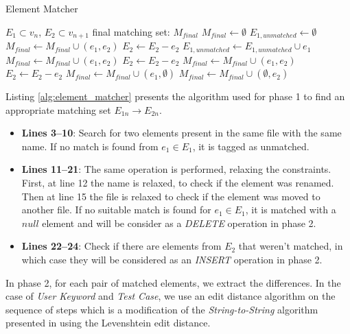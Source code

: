 \begin{algorithm}[!t]
\caption{Element Matcher}
\label{alg:element_matcher}
\begin{algorithmic}[1] 
\REQUIRE $E_1 \subset v_n$, $E_2 \subset v_{n+1}$
\ENSURE final matching set: $M_{final}$
\STATE $M_{final} \leftarrow \emptyset$
\STATE $E_{1,unmatched} \leftarrow \emptyset$
\STATE $M_{final} \leftarrow M_{final} \cup (e_1,e_2)$
\STATE $E_2 \leftarrow E_2 - e_2$
\ELSE
\STATE $E_{1,unmatched} \leftarrow E_{1,unmatched} \cup e_1$
\ENDIF
\ENDFOR
{}
\STATE $M_{final} \leftarrow M_{final} \cup (e_1,e_2)$
\STATE $E_2 \leftarrow E_2 - e_2$
\STATE $M_{final} \leftarrow M_{final} \cup (e_1,e_2)$
\STATE $E_2 \leftarrow E_2 - e_2$
\ELSE
\STATE $M_{final} \leftarrow M_{final} \cup (e_1,\emptyset)$
\ENDIF
\ENDFOR
{}
\STATE $M_{final} \leftarrow M_{final} \cup (\emptyset, e_2)$
\ENDFOR
\end{algorithmic}
\end{algorithm}

Listing \ref{alg:element_matcher} presents the algorithm used for phase 1 to find an appropriate matching set $E_{1n} \rightarrow E_{2n}$.

\begin{itemize}
    \item \textbf{Lines 3--10}: Search for two elements present in the same file with the same name. If no match is found from $e_1 \in E_1$, it is tagged as unmatched.

  \item \textbf{Lines 11--21}:  The same operation is performed, relaxing the constraints. First, at line 12 the name is relaxed, to check if the element was renamed. Then at line 15 the file is relaxed to check if the element was moved to another file. If no suitable match is found for $e_1 \in E_1$, it is matched with a $null$ element and will be consider as a \emph{DELETE} operation in phase 2.

\item \textbf{Lines 22--24}: Check if there are elements from $E_2$ that weren't matched, in which case they will be considered as an \emph{INSERT} operation in phase 2.
\end{itemize}

In phase 2, for each pair of matched elements, we extract the differences. In the case of \emph{User Keyword} and \emph{Test Case}, we use an edit distance algorithm on the sequence of steps which is a modification of the \emph{String-to-String} algorithm presented in \cite{Ukkonen1985} using the Levenshtein edit distance.

